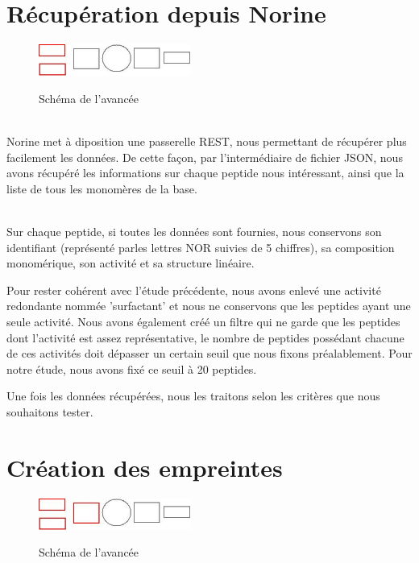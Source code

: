\documentclass[a4paper,10pt]{report}
\begin{document}
  
    \section{Récupération depuis Norine}
    
	\begin{figure}[!h]
	    \begin{center}
	      \includegraphics[width=5cm]{image/step1.jpeg} \\
	      \caption{Schéma de l'avancée}
	    \end{center}
	 \end{figure}
	   
	\\
	Norine met à diposition une passerelle REST, nous permettant de récupérer plus facilement les données.
	De cette façon, par l'intermédiaire de fichier JSON, nous avons récupéré les informations sur chaque peptide nous intéressant, ainsi que la liste de tous les monomères de la base.
	
	    
	~\\ Sur chaque peptide, si toutes les données sont fournies, nous conservons son identifiant (représenté parles lettres NOR suivies de 5 chiffres), sa composition monomérique, son activité et sa structure linéaire. 
	    
	Pour rester cohérent avec l'étude précédente, nous avons enlevé une activité redondante nommée 'surfactant' et nous ne conservons que les peptides ayant une seule activité.
	Nous avons également créé un filtre qui ne garde que les peptides dont l'activité est assez représentative, le nombre de peptides possédant chacune de ces activités doit dépasser un certain seuil que nous fixons préalablement. Pour notre étude, nous avons fixé ce seuil à 20 peptides.
      
	Une fois les données récupérées, nous les traitons selon les critères que nous souhaitons tester.   
   
    \section{Création des empreintes}
	
	\begin{figure}[!h]
	    \begin{center}
	      \includegraphics[width=5cm]{image/step2.jpeg} \\
	      \caption{Schéma de l'avancée}
	    \end{center}
	 \end{figure}
	 
\end{document}
